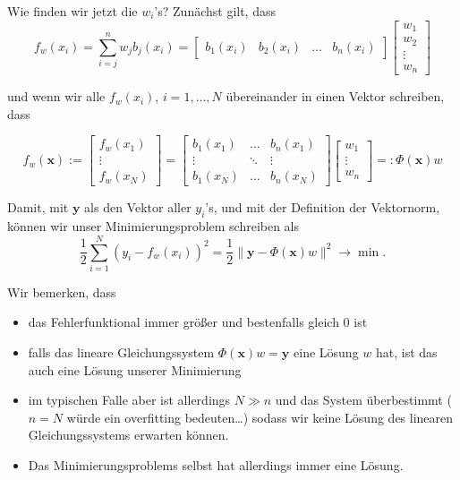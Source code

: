 \documentclass[]{book}
\providecommand{\tightlist}{%
  \setlength{\itemsep}{0pt}\setlength{\parskip}{0pt}}
\theoremstyle{definition}
\theoremstyle{definition}
\theoremstyle{definition}
\theoremstyle{definition}
\theoremstyle{remark}
\begin{document}
Wie finden wir jetzt die \(w_i\)'s? Zunächst gilt, dass
\begin{equation*}
f_w(x_i) = \sum_{i=j}^n w_j b_j(x_i) = 
\begin{bmatrix}
b_1(x_i) & b_2(x_i) & \dots & b_n(x_i)
\end{bmatrix}
\begin{bmatrix}
w_1 \\ w_2 \\ \vdots \\ w_n
\end{bmatrix}
\end{equation*}

und wenn wir alle \(f_w(x_i)\), \(i=1,\dotsc,N\) übereinander in einen Vektor schreiben, dass

\begin{equation*}
f_w(\mathbf x) := 
\begin{bmatrix}
f_w(x_1) \\ \vdots \\ f_w(x_N)
\end{bmatrix}
=
\begin{bmatrix}
b_1(x_1) & \dots & b_n(x_1) \\
\vdots & \ddots & \vdots \\
b_1(x_N) & \dots & b_n(x_N)
\end{bmatrix}
\begin{bmatrix}
w_1 \\ \vdots \\ w_n
\end{bmatrix}
=: \Phi(\mathbf x) w
\end{equation*}

Damit, mit \(\mathbf y\) als den Vektor aller \(y_i\)'s, und mit der Definition der Vektornorm, können wir unser Minimierungsproblem schreiben als
\begin{equation*}
\frac 12  \sum_{i=1}^N (y_i - f_w(x_i))^2 = \frac 12 \| \mathbf y - \Phi (\mathbf x) w\|^2 \to \min.
\end{equation*}

Wir bemerken, dass

\begin{itemize}
\tightlist
\item
  das Fehlerfunktional immer größer und bestenfalls gleich 0 ist
\item
  falls das lineare Gleichungssystem \(\Phi (\mathbf x)w = \mathbf y\) eine Lösung \(w\) hat, ist das auch eine Lösung unserer Minimierung
\item
  im typischen Falle aber ist allerdings \(N\gg n\) und das System überbestimmt (\(n=N\) würde ein overfitting bedeuten\ldots{}) sodass wir keine Lösung des linearen Gleichungssystems erwarten können.
\item
  Das Minimierungsproblems selbst hat allerdings immer eine Lösung.
\end{itemize}
\end{document}
